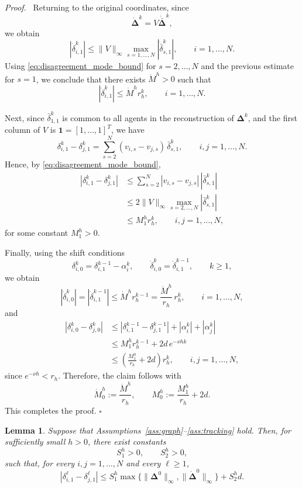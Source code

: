 \documentclass[letterpaper,journal]{IEEEtran}
\newtheorem{lemma}{Lemma}
\newenvironment{proof}{\par\noindent\textit{Proof.}\ }{\hfill$\square$\par}
\begin{document}
\begin{proof}
Returning to the original coordinates, since
\[
\dot{\bm{\Delta}}^k = V\dot{\bar{\bm{\Delta}}}^k,
\]
we obtain
\[
|\dot{\delta}_{i,1}^{k}|
\le
\|V\|_\infty \max_{s=1,\dots,N}|\dot{\bar{\delta}}_{s,1}^{k}|,
\qquad i=1,\dots,N.
\]
Using \eqref{eq:disagreement_mode_bound} for \(s=2,\dots,N\) and the previous estimate for \(s=1\), we conclude that there exists \(\dot M^h>0\) such that
\begin{equation}\label{eq:rate_bound_index1}
|\dot{\delta}_{i,1}^{k}|
\le
\dot M^h r_h^k,
\qquad i=1,\dots,N.
\end{equation}

Next, since \(\bar{\delta}_{1,1}^k\) is common to all agents in the reconstruction of \(\bm{\Delta}^k\), and the first column of \(V\) is \(\mathbf 1=[1,\dots,1]^T\), we have
\[
\delta_{i,1}^k-\delta_{j,1}^k
=
\sum_{s=2}^{N}(v_{i,s}-v_{j,s})\,\bar{\delta}_{s,1}^{k},
\qquad i,j=1,\dots,N.
\]
Hence, by \eqref{eq:disagreement_mode_bound},
\[
\begin{split}
|\delta_{i,1}^k-\delta_{j,1}^k|
&\le
\sum_{s=2}^{N}|v_{i,s}-v_{j,s}|\,|\bar{\delta}_{s,1}^{k}|
\\
&\le
2\|V\|_\infty \max_{s=2,\dots,N} |\bar{\delta}_{s,1}^{k}|
\\
&\le
M_1^h r_h^k,
\qquad i,j=1,\dots,N,
\end{split}
\]
for some constant \(M_1^h>0\).

Finally, using the shift conditions
\[
\delta_{i,0}^k=\delta_{i,1}^{k-1}-\alpha_i^{k},
\qquad
\dot\delta_{i,0}^k=\dot\delta_{i,1}^{k-1},
\qquad k\ge 1,
\]
we obtain
\[
|\dot\delta_{i,0}^k|
=
|\dot\delta_{i,1}^{k-1}|
\le
\dot M^h r_h^{k-1}
=
\frac{\dot M^h}{r_h}\,r_h^k,
\qquad i=1,\dots,N,
\]
and
\[
\begin{split}
|\delta_{i,0}^k-\delta_{j,0}^k|
&\le
|\delta_{i,1}^{k-1}-\delta_{j,1}^{k-1}|+|\alpha_i^k|+|\alpha_j^k|
\\
&\le
M_1^h r_h^{k-1}+2d\,e^{-\nu hk}
\\
&\le
\left(\frac{M_1^h}{r_h}+2d\right) r_h^k,
\qquad i,j=1,\dots,N,
\end{split}
\]
since \(e^{-\nu h}<r_h\). Therefore, the claim follows with
\[
\dot M_0^h:=\frac{\dot M^h}{r_h},
\qquad
M_0^h:=\frac{M_1^h}{r_h}+2d.
\]
This completes the proof.
\end{proof}

\begin{lemma}\label{lem:uniform_delta_difference_bound}
Suppose that Assumptions~\ref{ass:graph}--\ref{ass:tracking} hold. Then,  for sufficiently small \(h>0\), there exist constants
\[
S_1^h>0,\qquad S_2^h>0,
\]
such that, for every \(i,j=1,\dots,N\) and every \(\ell\ge 1\),
\[
|\delta_{i,1}^{\ell}-\delta_{j,1}^{\ell}|
\le
S_1^h \max\{\|\bm{\Delta}^0\|_\infty,\|\dot{\bm{\Delta}}^0\|_\infty\}
+
S_2^h d.
\]
\end{lemma}
\end{document}

